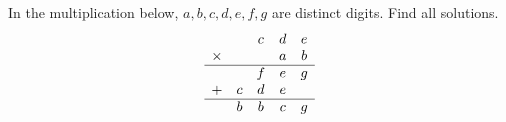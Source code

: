In the multiplication below, $a,b,c,d,e,f,g$ are distinct digits. Find all solutions.
\[\begin{array}{ccccc}&&c&d&e\\\times&&&a&b\\\hline&&f&e&g\\+&c&d&e&\\\hline&b&b&c&g\end{array}\]
